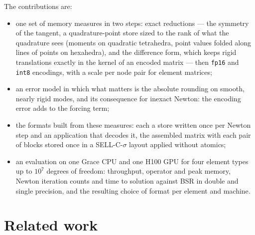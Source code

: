 \documentclass[sigconf,review]{acmart}
\begin{document}
The contributions are:
\begin{itemize}
\item one set of memory measures in two steps: exact reductions --- the symmetry of the tangent, a
  quadrature-point store sized to the rank of what the quadrature sees (moments on quadratic
  tetrahedra, point values folded along lines of points on hexahedra), and the difference form,
  which keeps rigid translations exactly in the kernel of an encoded matrix --- then \texttt{fp16}
  and \texttt{int8} encodings, with a scale per node pair for element matrices;
\item an error model in which what matters is the absolute rounding on smooth, nearly rigid modes,
  and its consequence for inexact Newton: the encoding error adds to the forcing term;
\item the formats built from these measures: each a store written once per Newton step and an
  application that decodes it, the assembled matrix with each pair of blocks stored once in a
  SELL-C-$\sigma$ layout applied without atomics;
\item an evaluation on one Grace CPU and one H100 GPU for four element types up to $10^7$ degrees of
  freedom: throughput, operator and peak memory, Newton iteration counts and time to solution against
  BSR in double and single precision, and the resulting choice of format per element and machine.
\end{itemize}

\section{Related work}
\end{document}
